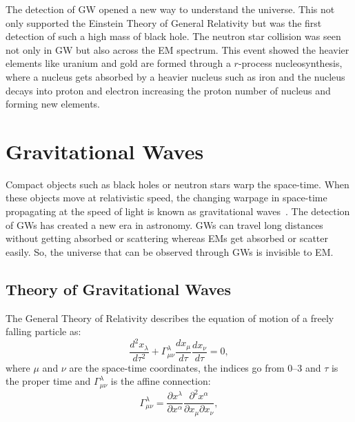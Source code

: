 \documentclass{ttuthes2007}
\begin{document}
The detection of \ac{GW} opened a new way to understand the universe. This not
only supported the Einstein Theory of General Relativity but was the first
detection of such a high mass of black hole. The neutron star collision was seen
not only in \ac{GW} but also across the \ac{EM} spectrum. This event showed the
heavier elements like uranium and gold are formed through a $r$-process
nucleosynthesis, where a nucleus gets absorbed by a heavier nucleus such as iron
and the nucleus decays into proton and electron increasing the proton number of
nucleus and forming new elements. 



\chapter{Gravitational Waves}
Compact objects such as black holes or neutron stars warp the space-time. When
these objects move at relativistic speed, the changing warpage in space-time
propagating at the speed of light is known as gravitational
waves~\cite{thorne1995gravitational}. The detection of \acp{GW} has created a
new era in astronomy.  \acp{GW} can travel long distances without getting
absorbed or scattering whereas \acp{EM} get absorbed or scatter easily. So, the
universe that can be observed through \acp{GW} is invisible to \ac{EM}. 

\section{Theory of Gravitational Waves}
The General Theory of Relativity describes the equation of motion of a freely
falling particle as:
\begin{equation}
\frac{d^2x_\lambda}{d\tau^2}+\Gamma^\lambda_{\mu\nu}\frac{dx_\mu}{d\tau}\frac{dx_\nu}{d\tau}=0,
\end{equation}
where $\mu$ and $\nu$ are the space-time coordinates, the indices go from 0--3
and
$\tau$ is the proper time and  $\Gamma^\lambda_{\mu\nu}$ is the affine connection:
\begin{equation}
\Gamma^\lambda_{\mu\nu} =\frac{\partial x^\lambda}{\partial
x^\alpha}\frac{\partial^2x^\alpha}{\partial x_\mu \partial x_\nu},
\end{equation}
\end{document}
